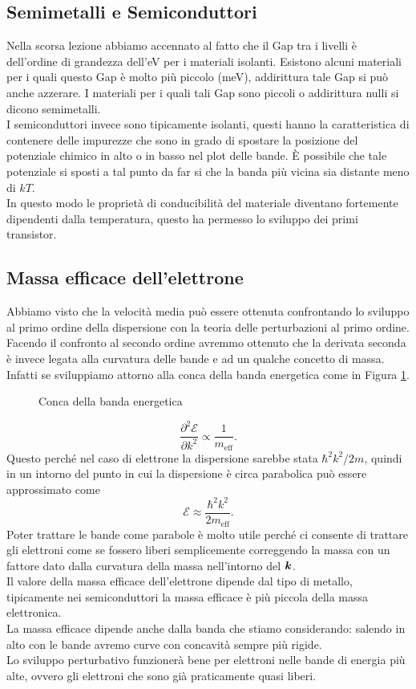 \subsection{Semimetalli e Semiconduttori}
\label{subsec:Semiconduttori}
Nella scorsa lezione abbiamo accennato al fatto che il Gap tra i livelli è dell'ordine di grandezza dell'eV per i materiali isolanti. Esistono alcuni materiali per i quali questo Gap è molto più piccolo (meV), addirittura tale Gap si può anche azzerare. I materiali per i quali tali Gap sono piccoli o addirittura nulli si dicono semimetalli. \\
I semiconduttori invece sono tipicamente isolanti, questi hanno la caratteristica di contenere delle impurezze che sono in grado di spostare la posizione del potenziale chimico in alto o in basso nel plot delle bande. È possibile che tale potenziale si sposti a tal punto da far si che la banda più vicina sia distante meno di $kT$. \\
In questo modo le proprietà di conducibilità del materiale diventano fortemente dipendenti dalla temperatura, questo ha permesso lo sviluppo dei primi transistor.
\subsection{Massa efficace dell'elettrone}
\label{subsec:Massa efficace dell'elettrone}
Abbiamo visto che la velocità media può essere ottenuta confrontando lo sviluppo al primo ordine della dispersione con la teoria delle perturbazioni al primo ordine. \\
Facendo il confronto al secondo ordine avremmo ottenuto che la derivata seconda è invece legata alla curvatura delle bande e ad un qualche concetto di massa.\\
Infatti se sviluppiamo attorno alla conca della banda energetica come in Figura \ref{fig:conca-della-banda-energetica}.
\begin{figure}[ht]
    \centering
    \caption{Conca della banda energetica}
    \label{fig:conca-della-banda-energetica}
\end{figure}
\[
	\frac{\partial ^2\mathcal{E}}{\partial k^2} \propto \frac{1}{m_\text{eff} }
.\] 
Questo perché nel caso di elettrone la dispersione sarebbe stata $\hbar ^2k^2/2m$, quindi in un intorno del punto in cui la dispersione è circa parabolica può essere approssimato come 
\[
	\mathcal{E}  \approx \frac{\hbar ^2 k^2}{2m_\text{eff} }
.\] 
Poter trattare le bande come parabole è molto utile perché ci consente di trattare gli elettroni come se fossero liberi semplicemente correggendo la massa con un fattore dato dalla curvatura della massa nell'intorno del $\boldsymbol{k}$.\\
Il valore della massa efficace dell'elettrone dipende dal tipo di metallo, tipicamente nei semiconduttori la massa efficace è più piccola della massa elettronica.\\
La massa efficace dipende anche dalla banda che stiamo considerando: salendo in alto con le bande avremo curve con concavità sempre più rigide.\\
Lo sviluppo perturbativo funzionerà bene per elettroni nelle bande di energia più alte, ovvero gli elettroni che sono già praticamente quasi liberi.
